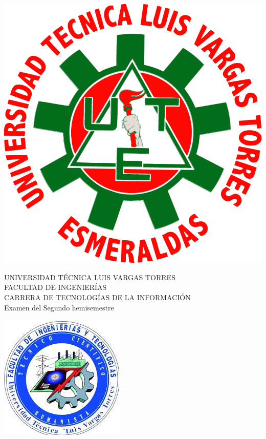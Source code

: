 \documentclass[12pt,answers]{exam}
\begin{document}
\thispagestyle{headandfoot}


\begin{minipage}[H]{0.10\linewidth}
  \flushleft
  \includegraphics[scale=0.12]{images/logoutlvte} 
\end{minipage}
\begin{minipage}[H]{0.70\linewidth}
  \begin{center}
    UNIVERSIDAD TÉCNICA LUIS VARGAS TORRES\\  FACULTAD DE INGENIERÍAS\\
    CARRERA DE TECNOLOGÍAS DE LA INFORMACIÓN \\ Examen del Segundo hemisemestre
  \end{center}
\end{minipage}
\begin{minipage}[H]{0.10\linewidth}
    \flushleft
    \includegraphics[scale=0.3]{images/logofit}
\end{minipage}
\end{document}
